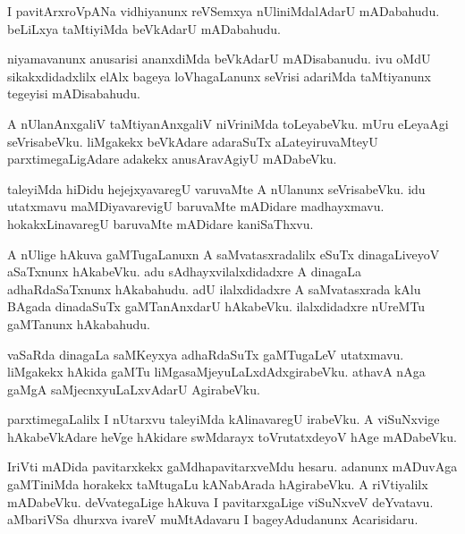 \documentclass{article}
\begin{document}
\begin{mn}%
I pavitArxroVpANa vidhiyanunx reVSemxya nUliniMdalAdarU mADabahudu. beLiLxya taMtiyiMda beVkAdarU 
mADabahudu.
\end{mn}

\begin{mn}%
niyamavanunx anusarisi ananxdiMda beVkAdarU mADisabanudu. ivu oMdU sikakxdidadxlilx elAlx bageya 
loVhagaLanunx seVrisi adariMda taMtiyanunx tegeyisi mADisabahudu.
\end{mn}

\begin{mn}%
A nUlanAnxgaliV taMtiyanAnxgaliV niVriniMda toLeyabeVku. mUru eLeyaAgi seVrisabeVku. liMgakekx 
beVkAdare adaraSuTx aLateyiruvaMteyU parxtimegaLigAdare adakekx anusAravAgiyU mADabeVku.
\end{mn}

\begin{mn}%
taleyiMda hiDidu hejejxyavaregU varuvaMte A nUlanunx seVrisabeVku. idu utatxmavu maMDiyavarevigU 
baruvaMte mADidare madhayxmavu. hokakxLinavaregU baruvaMte mADidare kaniSaThxvu.
\end{mn}

\begin{mn}%
A nUlige hAkuva gaMTugaLanuxn A saMvatasxradalilx eSuTx dinagaLiveyoV aSaTxnunx hAkabeVku. adu 
sAdhayxvilalxdidadxre A dinagaLa adhaRdaSaTxnunx hAkabahudu. adU ilalxdidadxre A saMvatasxrada 
kAlu BAgada dinadaSuTx gaMTanAnxdarU hAkabeVku. ilalxdidadxre nUreMTu gaMTanunx hAkabahudu.
\end{mn}

\begin{mn}%
vaSaRda dinagaLa saMKeyxya adhaRdaSuTx gaMTugaLeV utatxmavu. liMgakekx hAkida gaMTu 
liMgasaMjeyuLaLxdAdxgirabeVku. athavA nAga gaMgA saMjecnxyuLaLxvAdarU AgirabeVku.
\end{mn}

\begin{mn}%
parxtimegaLalilx I nUtarxvu taleyiMda kAlinavaregU irabeVku. A viSuNxvige hAkabeVkAdare heVge 
hAkidare swMdarayx toVrutatxdeyoV hAge mADabeVku.
\end{mn}

\begin{mn}%
IriVti mADida pavitarxkekx gaMdhapavitarxveMdu hesaru. adanunx mADuvAga gaMTiniMda horakekx 
taMtugaLu kANabArada hAgirabeVku. A riVtiyalilx mADabeVku. deVvategaLige hAkuva I pavitarxgaLige 
viSuNxveV deYvatavu. aMbariVSa dhurxva ivareV muMtAdavaru I bageyAdudanunx Acarisidaru.
\end{mn}
\end{document}

